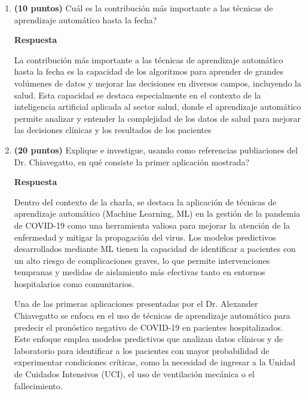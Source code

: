 \documentclass{article}
\begin{document}
\begin{enumerate}
\begin{enumerate}
\item \textbf{(10 puntos)} Cuál es la contribución más importante a las
técnicas de aprendizaje automático hasta la fecha?
\vspace{5px}
\par\textbf{Respuesta}
\vspace{5px}
\par La contribución más importante a las técnicas de aprendizaje automático hasta la fecha es la capacidad de los algoritmos para aprender de grandes volúmenes de datos y mejorar las decisiones en diversos campos, incluyendo la salud. Esta capacidad se destaca especialmente en el contexto de la inteligencia artificial aplicada al sector salud, donde el aprendizaje automático permite analizar y entender la complejidad de los datos de salud para mejorar las decisiones clínicas y los resultados de los pacientes
\item \textbf{(20 puntos)} Explique e investigue, usando como referencias
publiaciones del Dr. Chiavegatto, en qué consiste la primer aplicación
mostrada?
\vspace{5px}
\par\textbf{Respuesta}
\vspace{5px}
\par Dentro del contexto de la charla, se destaca la aplicación de técnicas de aprendizaje automático (Machine Learning, ML) en la gestión de la pandemia de COVID-19 como una herramienta valiosa para mejorar la atención de la enfermedad y mitigar la propagación del virus. Los modelos predictivos desarrollados mediante ML tienen la capacidad de identificar a pacientes con un alto riesgo de complicaciones graves, lo que permite intervenciones tempranas y medidas de aislamiento más efectivas tanto en entornos hospitalarios como comunitarios.
\vspace{5px}

Una de las primeras aplicaciones presentadas por el Dr. Alexander Chiavegatto se enfoca en el uso de técnicas de aprendizaje automático para predecir el pronóstico negativo de COVID-19 en pacientes hospitalizados. Este enfoque emplea modelos predictivos que analizan datos clínicos y de laboratorio para identificar a los pacientes con mayor probabilidad de experimentar condiciones críticas, como la necesidad de ingresar a la Unidad de Cuidados Intensivos (UCI), el uso de ventilación mecánica o el fallecimiento.
\vspace{5px}


\end{enumerate}
\end{enumerate}
\end{document}
